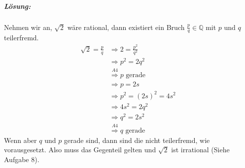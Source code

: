 \documentclass[12pt,a4paper,ngerman]{scrartcl}
\begin{document}
	\subparagraph{Lösung:} Nehmen wir an, $\sqrt{2}$ wäre rational, dann existiert ein Bruch $\frac{p}{q} \in \mathbb{Q}$ mit $p$ und $q$ teilerfremd.
	\begin{align*}
		\sqrt{2} = \frac{p}{q}
		&\Rightarrow 2 = \frac{p^2}{q^2}\\
		&\Rightarrow p^2 = 2q^2\\
		&\overset{A4}{\Rightarrow} p \text{ gerade}\\
		&\Rightarrow p = 2s\\
		&\Rightarrow p^2 = (2s)^2 = 4s^2\\
		&\Rightarrow 4s^2 = 2q^2\\
		&\Rightarrow q^2 = 2s^2\\
		&\overset{A4}{\Rightarrow} q \text{ gerade}
	\end{align*}
	Wenn aber $q$ und $p$ gerade sind, dann sind die nicht teilerfremd, wie vorausgesetzt. Also muss das Gegenteil gelten und $\sqrt{2}$ ist irrational (Siehe Aufgabe 8).
\end{document}
